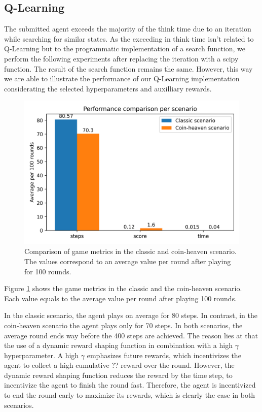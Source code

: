 \documentclass[
	letterpaper, %
	10pt, %
]{CSUniSchoolLabReport}
\begin{document}
\subsection{Q-Learning}
The submitted agent exceeds the majority of the think time due to an iteration while searching for
similar states.
As the exceeding in think time isn't related to Q-Learning but to the programmatic implementation of a search function,
we perform the following experiments after replacing the iteration with a scipy function.
The result of the search function remains the same.
However, this way we are able to illustrate the performance of our Q-Learning implementation
considerating the selected hyperparameters and auxilliary rewards.


\begin{figure}[h]
	\centering
	\includegraphics[scale=0.6]{Figures/metrics.png}
	\caption{Comparison of game metrics in the classic and coin-heaven scenario. The values
		correspond to an average value per round after playing for 100 rounds.}
	\label{img:metrics}
\end{figure}

Figure \ref{img:metrics} shows the game metrics in the classic and the coin-heaven
scenario. Each value equals to the average value per round after playing 100 rounds.

In the classic scenario, the agent plays on average for 80 steps. In contrast, in the
coin-heaven scenario the agent plays only for 70 steps. In both scenarios, the
average round ends way before the 400 steps are achieved. The reason lies at that
the use of a dynamic reward shaping function in combination with a high $\gamma$ hyperparameter.
A high $\gamma$ emphasizes future rewards, which incentivizes the agent to collect a high cumulative ?? reward
over the round. However, the dynamic reward shaping function reduces the reward by the time step,
to incentivize the agent to finish the round fast. Therefore, the agent is incentivized to end the
round early to maximize its rewards, which is clearly the case in both scenarios.
\end{document}
